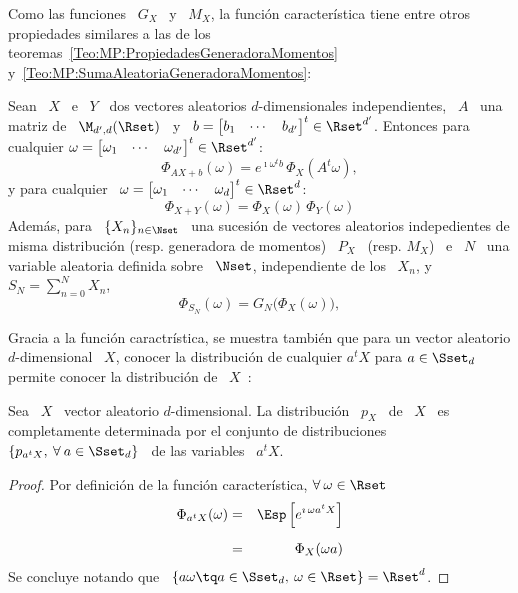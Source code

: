 {Como las  funciones \  $G_X$ \  y \ $M_X$,  la funci\'on  caracter\'istica tiene
entre      otros      propiedades      similares      a     las      de      los
teoremas~\ref{Teo:MP:PropiedadesGeneradoraMomentos}
y~\ref{Teo:MP:SumaAleatoriaGeneradoraMomentos}:
%
\begin{teorema}%
\label{Teo:MP:PropiedadesFuncionCaracteristica}
%
  Sean  \   $X$  \  e  \   $Y$  \  dos   vectores  aleatorios  $d$-dimensionales
  independientes,  \ $A$  \ una  matriz de  \  $\M_{d',d}(\Rset)$ \  y \  $b
  =  \begin{bmatrix} b_1  &  \cdots &  b_{d'}  \end{bmatrix}^t \in  \Rset^{d'}$.
  Entonces  para  cualquier  $\omega  =  \begin{bmatrix}  \omega_1  &  \cdots  &
    \omega_{d'} \end{bmatrix}^t \in \Rset^{d'}$:
  \[
  \Phi_{A X + b}(\omega) =  e^{\imath \omega^t b} \, \Phi_X\left( A^t \omega \right),
  \]
  y   para   cualquier \  $\omega   =   \begin{bmatrix}   \omega_1   &  \cdots   &
    \omega_d \end{bmatrix}^t \in \Rset^d$:
  \[
  \Phi_{X+Y}(\omega) = \Phi_X(\omega) \, \Phi_Y(\omega)
  \]
  Adem\'as,  para \  $\{ X_n  \}_{n \in  \Nset}$ \,  una sucesi\'on  de vectores
  aleatorios  indepedientes  de   misma  distribuci\'on  (resp.   generadora  de
  momentos) \ $P_X$ \ (resp. $M_X$) \  e \ $N$ \ una variable aleatoria definida
  sobre \ $\Nset$, independiente de los \ $X_n$, y \ $ S_N = \sum_{n=0}^N X_n$,
  \[
  \Phi_{S_N}(\omega) =  G_N \big( \Phi_X(\omega) \big),
  \]
\end{teorema}

Gracia a la  funci\'on caractr\'istica, se muestra tambi\'en  que para un vector
aleatorio $d$-dimensional \ $X$, conocer  la distribuci\'on de cualquier $a^t X$
para $a  \in \Sset_d$  permite conocer la  distribuci\'on de  \ $X$~\cite{Mui82,
  BilBre99, Sas13}:
%
\begin{teorema}\label{Teo:MP:CramerWold}
  Sea \ $X$ \ vector aleatorio $d$-dimensional. La distribuci\'on \ $p_X$ \ de \
  $X$  \  es completamente  determinada  por  el  conjunto de  distribuciones  \
  $\left\{ p_{a^t X},  \: \forall \: a \in  \Sset_d \right\}$  \ de las
  variables \ $a^t X$.
\end{teorema}
%
\begin{proof}
  Por definici\'on  de la funci\'on caracter\'istica, $\forall \: \omega \in \Rset$
  \begin{eqnarray*}
  \Phi_{a^t X}(\omega) & = & \Esp\left[ e^{\imath \, \omega a^t X} \right]\\[2mm]
  & = & \Phi_X(\omega a)
  \end{eqnarray*}
  Se concluye  notando que \ $\left\{  a \omega \tq a  \in \Sset_d, \:
    \omega \in \Rset \right\} = \Rset^d$.
\end{proof}

}

